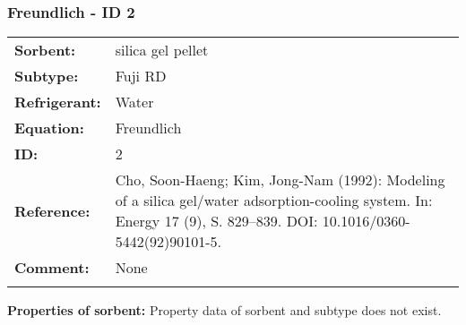\subsubsection{Freundlich - ID 2}
%
\begin{tabular}[l]{|lp{11.5cm}|}
\hline
\addlinespace

\textbf{Sorbent:} & silica gel pellet \\
\textbf{Subtype:} & Fuji RD \\
\textbf{Refrigerant:} & Water \\
\textbf{Equation:} & Freundlich \\
\textbf{ID:} & 2 \\
\textbf{Reference:} & Cho, Soon-Haeng; Kim, Jong-Nam (1992): Modeling of a silica gel/water adsorption-cooling system. In: Energy 17 (9), S. 829–839. DOI: 10.1016/0360-5442(92)90101-5. \\
\textbf{Comment:} & None \\

\addlinespace
\hline
\end{tabular}
\newline

\textbf{Properties of sorbent:}
\newline
%
Property data of sorbent and subtype does not exist.

